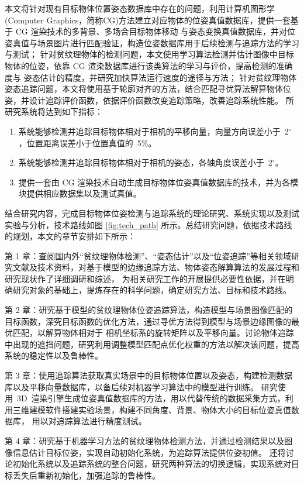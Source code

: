 本文将针对现有目标物体位置姿态数据库中存在的问题，利用计算机图形学(Computer Graphics，简称CG)方法建立对应物体的位姿真值数据库，提供一套基于 CG 渲染技术的多背景、多场合目标物体移动
与姿态变换真值数据库，并对位姿真值与场景图片进行匹配验证，构造位姿数据库用于后续检测与追踪方法的学习与测试；
针对贫纹理物体的检测问题，本文使用学习算法检测并估计图像中目标物体的位姿，依靠 CG 渲染数据库进行该类算法的学习与评价，提高检测的准确度与
姿态估计的精度，并研究加快算法运行速度的途径与方法；
针对贫纹理物体姿态追踪问题，本文将使用基于轮廓对齐的方法，结合匹配寻优算法解算物体位姿，并设计追踪评价函数，依据评价函数改变追踪策略，改善追踪系统性能。
所研究系统将达到如下指标：
\begin{enumerate}[(1)] 
  \item 系统能够检测并追踪目标物体相对于相机的平移向量，向量方向误差小于~2$^\circ$，位置距离误差小于位置真值的~5\%。
  \item 系统能够检测并追踪目标物体相对于相机的姿态，各轴角度误差小于~2$^\circ$。
  \item 提供一套由 CG 渲染技术自动生成目标物体位姿真值数据库的技术，并为各模块提供相应数据集以及测试真值。
  \end{enumerate}

结合研究内容，完成目标物体位姿检测与追踪系统的理论研究、系统实现以及测试实验与分析，技术路线如图 \ref{fig:tech_path} 所示。总结研究问题，依据技术路线的规划，本文的章节安排如下所示：

第 1 章：查阅国内外“贫纹理物体检测”、“姿态估计”以及“位姿追踪”等相关领域研究文献及技术资料，对基于模型的边缘追踪方法、物体姿态解算算法的发展过程和研究现状作了详细调研和综述，
为相关研究工作的开展提供必要性依据，并在明确研究对象的基础上，提炼存在的科学问题，确定研究方法、目标和技术路线。

第 2 章：研究基于模型的贫纹理物体位姿追踪算法，构造模型与场景图像匹配的目标函数，深究目标函数的优化方法，通过寻优方法得到模型与场景边缘图像的最优匹配，以解算物体相对于
相机坐标系的旋转矩阵以及平移向量。讨论物体追踪中出现的遮挡问题，研究利用调整模型匹配点优化权重的方法以解决该问题，提高系统的稳定性以及鲁棒性。

第 3 章：使用追踪算法获取真实场景中的目标物体位置以及姿态，构建检测数据库以及平移向量数据库，以备后续对机器学习算法中的模型进行训练。
研究使用~3D~渲染引擎生成位姿真值数据库的方法，用以代替传统的数据采集方式，利用三维建模软件搭建实验场景，构建不同角度、背景、物体大小的目标位姿真值数据库，
用以对追踪算法进行精度测试。

第 4 章：研究基于机器学习方法的贫纹理物体检测方法，并通过检测结果以及图像信息估计目标位姿，实现自动初始化系统，为追踪算法提供位姿初值。
还将讨论初始化系统以及追踪系统的整合问题，研究两种算法的切换逻辑，实现系统对目标丢失后重新初始化，加强追踪的鲁棒性。

